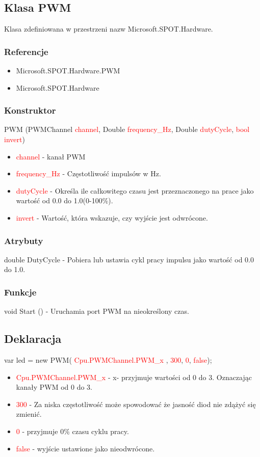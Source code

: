 \documentclass{article}
\begin{document}
\subsection{Klasa PWM}
Klasa zdefiniowana w przestrzeni nazw Microsoft.SPOT.Hardware. 
\subsubsection{Referencje}
\begin{itemize}
\item Microsoft.SPOT.Hardware.PWM
\item Microsoft.SPOT.Hardware
\end{itemize}
\subsubsection{Konstruktor}
PWM (PWMChannel \textcolor{red}{channel}, Double \textcolor{red}{frequency\_Hz}, Double \textcolor{red}{dutyCycle},  \textcolor{red}{bool invert})
\begin{itemize}
\item \textcolor{red}{channel} - kanał PWM
\item \textcolor{red}{frequency\_Hz} - Częstotliwość impulsów w Hz.
\item \textcolor{red}{dutyCycle} - Określa ile całkowitego czasu jest przeznaczonego na prace jako wartość od 0.0 do 1.0(0-100\%).
\item \textcolor{red}{invert} - Wartość, która wskazuje, czy wyjście jest odwrócone.
\end{itemize}
\subsubsection{Atrybuty}
double DutyCycle - Pobiera lub ustawia cykl pracy impulsu jako wartość od 0.0 do 1.0.
\subsubsection{Funkcje}
void Start () - Uruchamia port PWM na nieokreślony czas.
\subsection{Deklaracja}
 var led = new PWM(\space \textcolor{red}{ Cpu.PWMChannel.PWM\_x },\space \textcolor{red}{ 300},\space \textcolor{red}{ 0}, \space \textcolor{red}{ false});
\begin{itemize}
\item \textcolor{red}{Cpu.PWMChannel.PWM\_x} - x- przyjmuje wartości od 0 do 3. Oznaczając kanały PWM od 0 do 3.
\item \textcolor{red}{300} - Za niska częstotliwość może spowodować że jasność diod nie zdążyć się zmienić.
\item \textcolor{red}{0} - przyjmuje 0\% czasu cyklu pracy.
\item \textcolor{red}{false} - wyjście ustawione jako nieodwrócone.
\end{itemize}
\end{document}
